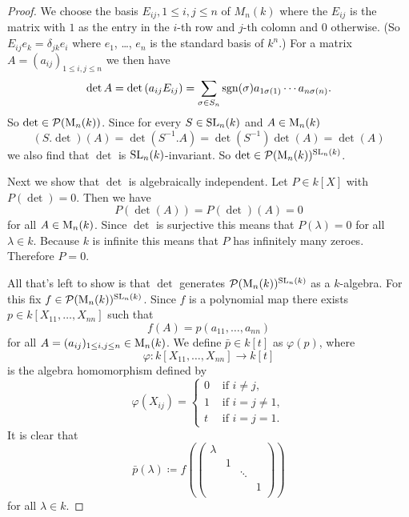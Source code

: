 \begin{proof}
 We choose the basis $E_{ij}, 1 \leq i,j \leq n$ of $M_n(k)$ where the $E_{ij}$ is the matrix with $1$ as the entry in the $i$-th row and $j$-th colomn and $0$ otherwise. (So $E_{ij} e_k = \delta_{jk}e_i$ where $e_1$, \dots, $e_n$ is the standard basis of $k^n$.)  For a matrix $A = (a_{ij})_{1 \leq i,j \leq n}$ we then have
 \[
  \det A
  = \det\left( a_{ij} E_{ij}\right)
  = \sum_{\sigma \in S_n} \operatorname{sgn}(\sigma) a_{1 \sigma(1)} \dotsm a_{n \sigma(n)}.
 \]
 So $\det \in \mathcal{P}(\operatorname{M}_n(k))$. Since for every $S \in \operatorname{SL}_n(k)$ and $A \in \operatorname{M}_n(k)$
 \[
  (S.\det)(A) = \det\left(S^{-1}.A\right) = \det\left(S^{-1}\right) \det(A) = \det(A)
 \]
 we also find that $\det$ is $\operatorname{SL}_n(k)$-invariant. So $\det \in \mathcal{P}(\operatorname{M}_n(k))^{\operatorname{SL}_n(k)}$.
 
 Next we show that $\det$ is algebraically independent. Let $P \in k[X]$ with $P(\det) = 0$. Then we have
 \[
  P(\det(A)) = P(\det)(A) = 0
 \]
 for all $A \in \operatorname{M}_n(k)$. Since $\det$ is surjective this means that $P(\lambda) = 0$ for all $\lambda \in k$. Because $k$ is infinite this means that $P$ has infinitely many zeroes. Therefore $P = 0$.
 
 All that’s left to show is that $\det$ generates $\mathcal{P}(\operatorname{M}_n(k))^{\operatorname{SL}_n(k)}$ as a $k$-algebra. For this fix $f \in \mathcal{P}(\operatorname{M}_n(k))^{\operatorname{SL}_n(k)}$. Since $f$ is a polynomial map there exists $p \in k[X_{11}, \dotsc, X_{nn}]$ such that
 \[
  f(A) = p(a_{11}, \dotsc, a_{nn})
 \]
 for all $A = (a_{ij})_{1 \leq i,j \leq n} \in \operatorname{M}_n(k)$. We define $\bar{p} \in k[t]$ as $\varphi(p)$, where
 \[
  \varphi \colon k[X_{11}, \dotsc, X_{nn}] \to k[t]
 \] 
 is the algebra homomorphism defined by 
 \[
  \varphi(X_{ij}) =
  \begin{cases}
   0 & \text{ if } i \neq j, \\
   1 & \text{ if } i = j \neq 1, \\
   t & \text{ if } i = j = 1.
  \end{cases}
 \]
 It is clear that
 \[
  \bar{p}(\lambda) \coloneqq
  f\left(
   \begin{pmatrix}
    \lambda &   &        &   \\
            & 1 &        &   \\
            &   & \ddots &   \\
            &   &        & 1 \\
   \end{pmatrix}
  \right)
 \]
 for all $\lambda \in k$.
 

\end{proof}
